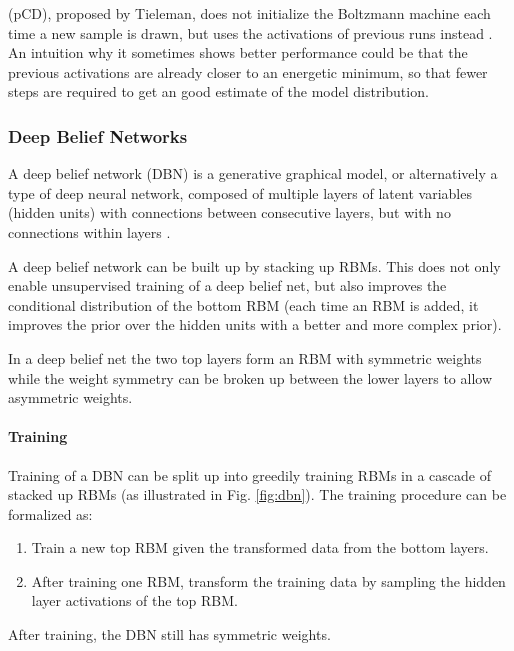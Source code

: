 (pCD), proposed by Tieleman, does not initialize the Boltzmann machine each time a new sample is drawn, but uses the activations of previous runs instead \cite{tieleman2008training}. An intuition why it sometimes shows better performance could be that the previous activations are already closer to an energetic minimum, so that fewer steps are required to get an good estimate of the model distribution. 


\subsubsection{Deep Belief Networks} \label{c:dbns}

A deep belief network (DBN) is a generative graphical model, or alternatively a type of deep neural network, composed of multiple layers of latent variables (hidden units) with connections between consecutive layers, but with no connections within layers \cite{Goodfellow-et-al-2016-Book}\cite{hinton2009deep}\cite{hinton2006fast}.

A deep belief network can be built up by stacking up RBMs.
This does not only enable unsupervised training of a deep belief net, but also improves the conditional distribution of the bottom RBM (each time an RBM is added, it improves the prior over the hidden units with a better and more complex prior).

In a deep belief net the two top layers form an RBM with symmetric weights while the weight symmetry can be broken up between the lower layers to allow asymmetric weights.   

\paragraph{Training} \label{c:dbntraining}

Training of a DBN can be split up into greedily training RBMs in a cascade of stacked up RBMs (as illustrated in Fig. \ref{fig:dbn}).
The training procedure can be formalized as:  
\begin{enumerate}
\item Train a new top RBM given the transformed data from the bottom layers.
\item After training one RBM, transform the training data by sampling the hidden layer activations of the top RBM.
\end{enumerate}

After training, the DBN still has symmetric weights. 

